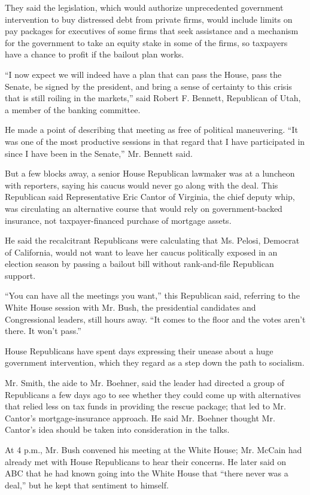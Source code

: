 They said the legislation, which would authorize unprecedented
government intervention to buy distressed debt from private firms, would
include limits on pay packages for executives of some firms that seek
assistance and a mechanism for the government to take an equity stake in
some of the firms, so taxpayers have a chance to profit if the bailout
plan works.

``I now expect we will indeed have a plan that can pass the House, pass
the Senate, be signed by the president, and bring a sense of certainty
to this crisis that is still roiling in the markets,'' said Robert F.
Bennett, Republican of Utah, a member of the banking committee.

He made a point of describing that meeting as free of political
maneuvering. ``It was one of the most productive sessions in that regard
that I have participated in since I have been in the Senate,'' Mr.
Bennett said.

But a few blocks away, a senior House Republican lawmaker was at a
luncheon with reporters, saying his caucus would never go along with the
deal. This Republican said Representative Eric Cantor of Virginia, the
chief deputy whip, was circulating an alternative course that would rely
on government-backed insurance, not taxpayer-financed purchase of
mortgage assets.

He said the recalcitrant Republicans were calculating that Ms. Pelosi,
Democrat of California, would not want to leave her caucus politically
exposed in an election season by passing a bailout bill without
rank-and-file Republican support.

``You can have all the meetings you want,'' this Republican said,
referring to the White House session with Mr. Bush, the presidential
candidates and Congressional leaders, still hours away. ``It comes to
the floor and the votes aren't there. It won't pass.''

House Republicans have spent days expressing their unease about a huge
government intervention, which they regard as a step down the path to
socialism.

Mr. Smith, the aide to Mr. Boehner, said the leader had directed a group
of Republicans a few days ago to see whether they could come up with
alternatives that relied less on tax funds in providing the rescue
package; that led to Mr. Cantor's mortgage-insurance approach. He said
Mr. Boehner thought Mr. Cantor's idea should be taken into consideration
in the talks.

At 4 p.m., Mr. Bush convened his meeting at the White House; Mr. McCain
had already met with House Republicans to hear their concerns. He later
said on ABC that he had known going into the White House that ``there
never was a deal,'' but he kept that sentiment to himself.

